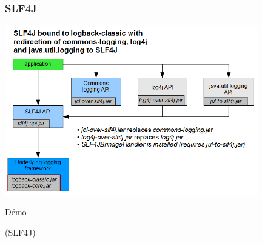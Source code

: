 \begin{frame}
	\frametitle{SLF4J}

    \centerline{\includegraphics[width=11cm]{img/slf4j.png}}
\end{frame}

\begin{frame}
    \begin{center}
    \fontsize{48pt}{7.2}\selectfont
    D\'{e}mo
    \end{center}
    \begin{center}
    (SLF4J)
    \end{center}
\end{frame}
